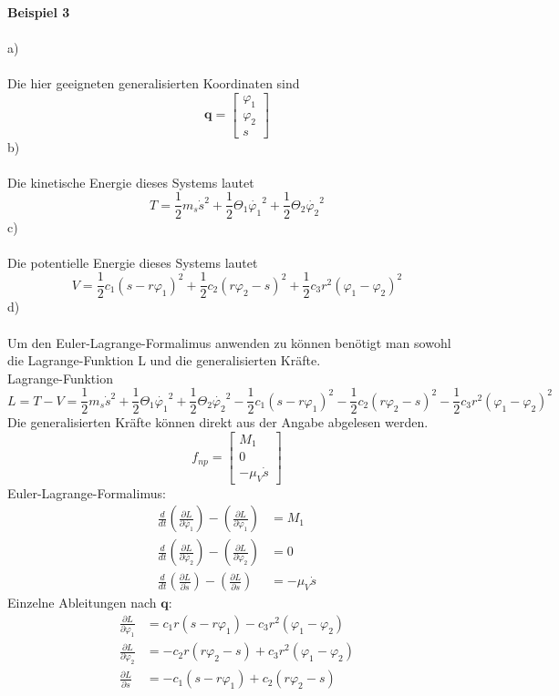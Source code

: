 \textbf{Beispiel 3} \\ \\
a) \\ \\
Die hier geeigneten generalisierten Koordinaten sind
\[
	\textbf{q} = \begin{bmatrix}
		\varphi_1 \\
		\varphi_2 \\
		s
	\end{bmatrix}
\]
b)\\ \\
Die kinetische Energie dieses Systems lautet
\[
	T = \frac{1}{2}m_s\dot{s}^2 + \frac{1}{2} \Theta_1 \dot{\varphi_1}^2 + \frac{1}{2} \Theta_2 \dot{\varphi_2}^2
\]
c) \\ \\
Die potentielle Energie dieses Systems lautet
\[
	V = \frac{1}{2} c_1 (s - r\varphi_1)^2 + \frac{1}{2} c_2 (r\varphi_2 - s)^2 + \frac{1}{2} c_3 r^2(\varphi_1 - \varphi_2)^2
\]
d) \\ \\
Um den Euler-Lagrange-Formalimus anwenden zu können benötigt man sowohl die Lagrange-Funktion L und die generalisierten Kräfte. \\
Lagrange-Funktion
\[
	L = T - V = \frac{1}{2}m_s\dot{s}^2 + \frac{1}{2} \Theta_1 \dot{\varphi_1}^2 + \frac{1}{2} \Theta_2 \dot{\varphi_2}^2 - \frac{1}{2} c_1 (s - r\varphi_1)^2 - \frac{1}{2} c_2 (r\varphi_2 - s)^2 - \frac{1}{2} c_3 r^2(\varphi_1 - \varphi_2)^2
\]
Die generalisierten Kräfte können direkt aus der Angabe abgelesen werden.
\[
	f_{np} = \begin{bmatrix}
		M_1 \\
		0 \\
		-\mu_V\dot{s}
	\end{bmatrix}
\]
Euler-Lagrange-Formalimus:
\begin{align*}
	\frac{d}{dt}\left(\frac{\partial L}{\partial \dot{\varphi_1}}\right) - \left(\frac{\partial L}{\partial\varphi_1}\right) &= M_1\\
	\frac{d}{dt}\left(\frac{\partial L}{\partial \dot{\varphi_2}}\right) - \left(\frac{\partial L}{\partial \varphi_2}\right) &= 0\\
	\frac{d}{dt}\left(\frac{\partial L}{\partial \dot{s}}\right) - \left(\frac{\partial L}{\partial s}\right) &= -\mu_V\dot{s}
\end{align*}
Einzelne Ableitungen nach $\textbf{q}$:
\begin{align*}
	\frac{\partial L}{\partial \varphi_1} &= c_1r(s - r\varphi_1) - c_3r^2(\varphi_1 - \varphi_2) \\
	\frac{\partial L}{\partial \varphi_2} &= - c_2r(r\varphi_2 - s) + c_3r^2(\varphi_1 - \varphi_2) \\
	\frac{\partial L}{\partial s} &= -c_1(s - r\varphi_1) + c_2(r\varphi_2 - s)
\end{align*}
